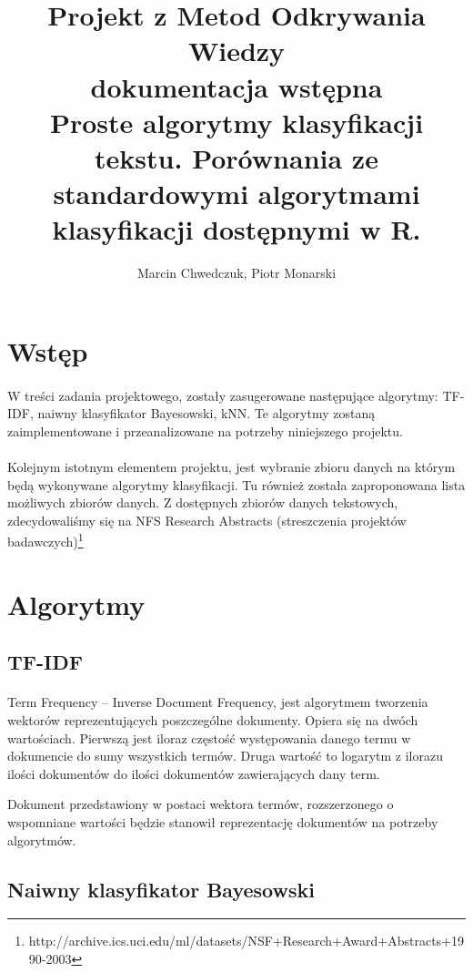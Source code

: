 \documentclass[a4paper,12pt]{article}
\title{Projekt z Metod Odkrywania Wiedzy\\dokumentacja wstępna\\\large{Proste algorytmy klasyfikacji tekstu. Porównania ze standardowymi algorytmami klasyfikacji dostępnymi w R.}\\}
\author{Marcin Chwedczuk, Piotr Monarski}
\date{}
\begin{document}
\maketitle

\section{Wstęp}
\paragraph{}
W treści zadania projektowego, zostały zasugerowane następujące algorytmy:
TF-IDF, naiwny klasyfikator Bayesowski, kNN. Te algorytmy zostaną
zaimplementowane i przeanalizowane na potrzeby niniejszego projektu.  

\paragraph{}
Kolejnym istotnym elementem projektu, jest wybranie zbioru danych na którym
będą wykonywane algorytmy klasyfikacji. Tu również została zaproponowana
lista możliwych zbiorów danych. Z dostępnych zbiorów danych tekstowych,
zdecydowaliśmy się na NFS Research Abstracts (streszczenia projektów
badawczych)\footnote{http://archive.ics.uci.edu/ml/datasets/NSF+Research+Award+Abstracts+1990-2003}

\section{Algorytmy}
\subsection{TF-IDF}
\paragraph{}
Term Frequency – Inverse Document Frequency, jest algorytmem tworzenia
wektorów reprezentujących poszczególne dokumenty. Opiera się na dwóch
wartościach. Pierwszą jest iloraz częstość występowania danego termu w
dokumencie do sumy wszystkich termów. Druga wartość to logarytm z ilorazu
ilości dokumentów do ilości dokumentów zawierających dany term. 

Dokument przedstawiony w postaci wektora termów, rozszerzonego o wspomniane
wartości będzie stanowił reprezentację dokumentów na potrzeby algorytmów. 

\subsection{Naiwny klasyfikator Bayesowski}
\end{document}
